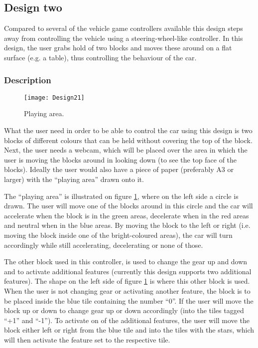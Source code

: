 \subsection{Design two}
Compared to several of the vehicle game controllers available this design steps away from controlling the vehicle using a steering-wheel-like controller. In this design, the user grabs hold of two blocks and moves these around on a flat surface (e.g. a table), thus controlling the behaviour of the car.

\subsubsection*{Description}

\begin{figure}[h]
\centering
\texttt{[image: Design21]}
\caption{Playing area.}
\label{fig:design21}
\end{figure}

What the user need in order to be able to control the car using this design is two blocks of different colours that can be held without covering the top of the block. Next, the user needs a webcam, which will be placed over the area in which the user is moving the blocks around in looking down (to see the top face of the blocks). Ideally the user would also have a piece of paper (preferably A3 or larger) with the “playing area” drawn onto it.
\bigskip

The “playing area” is illustrated on figure \ref{fig:design21}, where on the left side a circle is drawn. The user will move one of the blocks around in this circle and the car will accelerate when the block is in the green areas, decelerate when in the red areas and neutral when in the blue areas. By moving the block to the left or right (i.e. moving the block inside one of the bright-coloured areas), the car will turn accordingly while still accelerating, decelerating or none of those.

The other block used in this controller, is used to change the gear up and down and to activate additional features (currently this design supports two additional features). The shape on the left side of figure \ref{fig:design21} is where this other block is used. When the user is not changing gear or activating another feature, the block is to be placed inside the blue tile containing the number “0”. If the user will move the block up or down to change gear up or down accordingly (into the tiles tagged “+1” and “-1”). To activate on of the additional features, the user will move the block either left or right from the blue tile and into the tiles with the stars, which will then activate the feature set to the respective tile.

